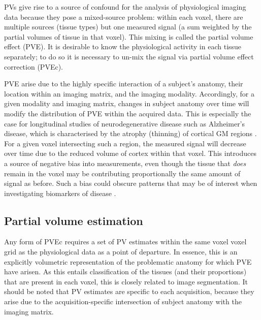 PVs give rise to a source of confound for the analysis of physiological imaging data because they pose a mixed-source problem: within each voxel, there are multiple sources (tissue types) but one measured signal (a sum weighted by the partial volumes of tissue in that voxel). This mixing is called the partial volume effect (PVE). It is desirable to know the physiological activity in each tissue separately; to do so it is necessary to un-mix the signal via partial volume effect correction (PVEc). 

PVE arise due to the highly specific interaction of a subject's anatomy, their location within an imaging matrix, and the imaging modality. Accordingly, for a given modality and imaging matrix, changes in subject anatomy over time will modify the distribution of PVE within the acquired data. This is especially the case for longitudinal studies of neurodegenerative disease such as Alzheimer's disease, which is characterised by the atrophy (thinning) of cortical GM regions \cite{Thompson2003}. For a given voxel intersecting such a region, the measured signal will decrease over time due to the reduced volume of cortex within that voxel. This introduces a source of negative bias into measurements, even though the tissue that \textit{does} remain in the voxel may be contributing proportionally the same amount of signal as before. Such a bias could obscure patterns that may be of interest when investigating biomarkers of disease \cite{Thomas2011}. 

\subsection{Partial volume estimation}

Any form of PVEc requires a set of PV estimates within the same voxel voxel grid as the physiological data as a point of departure. In essence, this is an explicitly volumetric representation of the problematic anatomy for which PVE have arisen. As this entails classification of the tissues (and their proportions) that are present in each voxel, this is closely related to image segmentation. It should be noted that PV estimates are specific to each acquisition, because they arise due to the acquisition-specific intersection of subject anatomy with the imaging matrix. 

